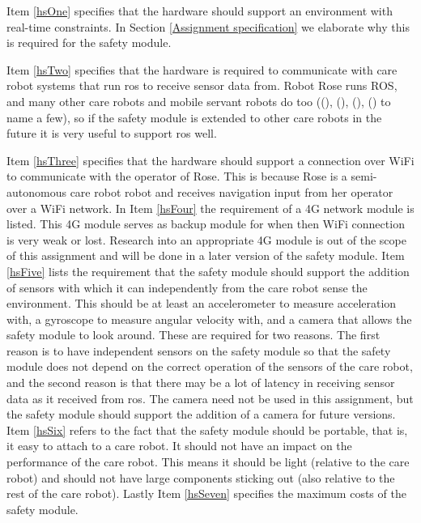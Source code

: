 \documentclass[12pt]{scrreprt}
\begin{document}
Item \ref{hsOne} specifies that the hardware should support an environment with real-time constraints. In Section \ref{Assignment specification} we elaborate why this is required for the safety module.
\par
Item \ref{hsTwo} specifies that the hardware is required to communicate with care robot systems that run \acrlong{ros} to receive sensor data from. Robot Rose runs ROS, and many other care robots and mobile servant robots do too ((\cite{human-robot}), (\cite{spencer}), (\cite{delgado}), (\cite{dimitris}) to name a few), so if the safety module is extended to other care robots in the future it is very useful to support \acrshort{ros} well. 
\par
Item \ref{hsThree} specifies that the hardware should support a connection over WiFi to communicate with the operator of Rose. This is because Rose is a semi-autonomous care robot robot and receives navigation input from her operator over a WiFi network. In Item \ref{hsFour} the requirement of a 4G network module is listed. This 4G module serves as backup module for when then WiFi connection is very weak or lost. Research into an appropriate 4G module is out of the scope of this assignment and will be done in a later version of the safety module.
Item \ref{hsFive} lists the requirement that the safety module should support the addition of sensors with which it can independently from the care robot sense the environment. This should be at least an accelerometer to measure acceleration with, a gyroscope to measure angular velocity with, and a camera that allows the safety module to look around. These are required for two reasons. The first reason is to have independent sensors on the safety module so that the safety module does not depend on the correct operation of the sensors of the care robot, and the second reason is that there may be a lot of latency in receiving sensor data as it received from \acrshort{ros}. The camera need not be used in this assignment, but the safety module should support the addition of a camera for future versions. 
Item \ref{hsSix} refers to the fact that the safety module should be portable, that is, it easy to attach to a care robot. It should not have an impact on the performance of the care robot. This means it should be light (relative to the care robot) and should not have large components sticking out (also relative to the rest of the care robot).
Lastly Item \ref{hsSeven} specifies the maximum costs of the safety module.
\end{document}
